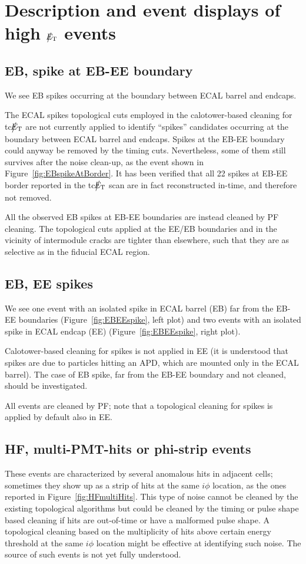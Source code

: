 \section{Description and event displays of high $\big\slash\hspace{-1.6ex}{E_\text{T}}$ events} \label{EventDisplay}

\subsection{EB, spike at EB-EE boundary}
We see EB spikes occurring at the boundary between ECAL barrel and endcaps.

The ECAL spikes topological cuts employed in the calotower-based cleaning for tc$\big\slash\hspace{-1.6ex}{E_\text{T}}$ 
are not currently applied to identify ``spikes'' candidates occurring at the boundary between ECAL barrel and endcaps. 
Spikes at the EB-EE boundary could anyway be removed by the timing cuts. Nevertheless, some of them still survives 
after the noise clean-up, as the event shown in Figure~\ref{fig:EBspikeAtBorder}.
It has been verified that all 22 spikes at EB-EE border reported in the tc$\big\slash\hspace{-1.6ex}{E_\text{T}}$ scan are in fact reconstructed in-time, 
and therefore not removed.

All the observed EB spikes at EB-EE boundaries are instead cleaned by PF cleaning. 
The topological cuts applied at the EE/EB boundaries and in
the vicinity of intermodule cracks are tighter than elsewhere, such that they are 
as selective as in the fiducial ECAL region. 

\subsection{EB, EE spikes}
We see one event with an isolated spike in ECAL barrel (EB) far from the EB-EE boundaries 
(Figure~\ref{fig:EBEEspike}, left plot) and two events with an isolated spike in ECAL 
endcap (EE) (Figure~\ref{fig:EBEEspike}, right plot).

Calotower-based cleaning for spikes is not applied in EE (it is understood that 
spikes are due to particles hitting an APD, which are mounted only in the ECAL barrel). 
The case of EB spike, far from the EB-EE boundary and not cleaned, should be investigated.

All events are cleaned by PF; note that a topological cleaning for spikes is applied by default also in EE.

\subsection{HF, multi-PMT-hits or phi-strip events}
These events are characterized by several anomalous hits in adjacent cells; sometimes they show up as
a strip of hits at the same $i\phi$ location, as the ones reported in Figure~\ref{fig:HFmultiHits}. 
This type of noise cannot be cleaned by the existing topological algorithms but could 
be cleaned by the timing or pulse shape based 
cleaning if hits are out-of-time or have a malformed pulse shape. 
A topological cleaning based on the multiplicity of hits above certain energy threshold 
at the same $i\phi$ location might be effective at identifying such noise.
The source of such events is not yet fully understood.

